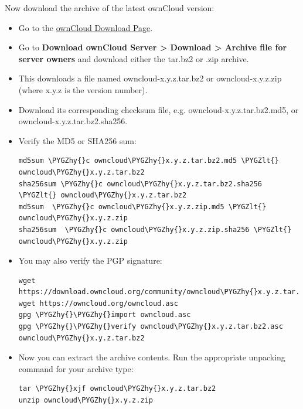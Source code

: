 \documentclass[letterpaper,10pt,english]{sphinxmanual}
\def\PYGZlt{\char`\<}
\def\PYGZhy{\char`\-}
\begin{document}
Now download the archive of the latest ownCloud version:
\begin{itemize}
\item {} 
Go to the \href{https://owncloud.org/install}{ownCloud Download Page}.

\item {} 
Go to \textbf{Download ownCloud Server \textgreater{} Download \textgreater{} Archive file for
server owners} and download either the tar.bz2 or .zip archive.

\item {} 
This downloads a file named owncloud-x.y.z.tar.bz2 or owncloud-x.y.z.zip
(where x.y.z is the version number).

\item {} 
Download its corresponding checksum file, e.g. owncloud-x.y.z.tar.bz2.md5,
or owncloud-x.y.z.tar.bz2.sha256.

\item {} 
Verify the MD5 or SHA256 sum:

\begin{Verbatim}[commandchars=\\\{\}]
md5sum \PYGZhy{}c owncloud\PYGZhy{}x.y.z.tar.bz2.md5 \PYGZlt{} owncloud\PYGZhy{}x.y.z.tar.bz2
sha256sum \PYGZhy{}c owncloud\PYGZhy{}x.y.z.tar.bz2.sha256 \PYGZlt{} owncloud\PYGZhy{}x.y.z.tar.bz2
md5sum  \PYGZhy{}c owncloud\PYGZhy{}x.y.z.zip.md5 \PYGZlt{} owncloud\PYGZhy{}x.y.z.zip
sha256sum  \PYGZhy{}c owncloud\PYGZhy{}x.y.z.zip.sha256 \PYGZlt{} owncloud\PYGZhy{}x.y.z.zip
\end{Verbatim}

\item {} 
You may also verify the PGP signature:

\begin{Verbatim}[commandchars=\\\{\}]
wget https://download.owncloud.org/community/owncloud\PYGZhy{}x.y.z.tar.bz2.asc
wget https://owncloud.org/owncloud.asc
gpg \PYGZhy{}\PYGZhy{}import owncloud.asc
gpg \PYGZhy{}\PYGZhy{}verify owncloud\PYGZhy{}x.y.z.tar.bz2.asc owncloud\PYGZhy{}x.y.z.tar.bz2
\end{Verbatim}

\item {} 
Now you can extract the archive contents. Run the appropriate unpacking
command for your archive type:

\begin{Verbatim}[commandchars=\\\{\}]
tar \PYGZhy{}xjf owncloud\PYGZhy{}x.y.z.tar.bz2
unzip owncloud\PYGZhy{}x.y.z.zip
\end{Verbatim}


\end{itemize}
\end{document}
